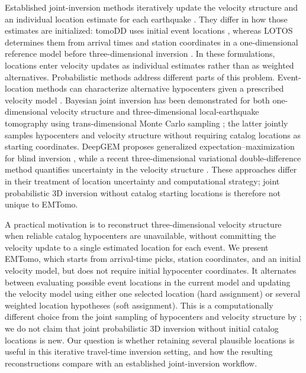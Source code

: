 \documentclass[12pt, a4paper]{article}
\begin{document}
Established joint-inversion methods iteratively update the velocity structure and an individual location estimate for each earthquake \parencite{thurber1983}. They differ in how those estimates are initialized: tomoDD uses initial event locations \parencite{zhang2003}, whereas LOTOS determines them from arrival times and station coordinates in a one-dimensional reference model before three-dimensional inversion \parencite{koulakov2009}. In these formulations, locations enter velocity updates as individual estimates rather than as weighted alternatives. Probabilistic methods address different parts of this problem. Event-location methods can characterize alternative hypocenters given a prescribed velocity model \parencite{lomax2000,smith2022}. Bayesian joint inversion has been demonstrated for both one-dimensional velocity structure \parencite{ryberg2019} and three-dimensional local-earthquake tomography using trans-dimensional Monte Carlo sampling \parencite{pianaagostinetti2015}; the latter jointly samples hypocenters and velocity structure without requiring catalog locations as starting coordinates. DeepGEM proposes generalized expectation--maximization for blind inversion \parencite{gao2021}, while a recent three-dimensional variational double-difference method quantifies uncertainty in the velocity structure \parencite{yang2025}. These approaches differ in their treatment of location uncertainty and computational strategy; joint probabilistic 3D inversion without catalog starting locations is therefore not unique to EMTomo.

A practical motivation is to reconstruct three-dimensional velocity structure when reliable catalog hypocenters are unavailable, without committing the velocity update to a single estimated location for each event. We present EMTomo, which starts from arrival-time picks, station coordinates, and an initial velocity model, but does not require initial hypocenter coordinates. It alternates between evaluating possible event locations in the current model and updating the velocity model using either one selected location (hard assignment) or several weighted location hypotheses (soft assignment). This is a computationally different choice from the joint sampling of hypocenters and velocity structure by \textcite{pianaagostinetti2015}; we do not claim that joint probabilistic 3D inversion without initial catalog locations is new. Our question is whether retaining several plausible locations is useful in this iterative travel-time inversion setting, and how the resulting reconstructions compare with an established joint-inversion workflow.
\end{document}
